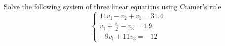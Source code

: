 \documentclass[a4paper, 12pt]{report}
\begin{document}
    \newpage
    \begin{tcolorbox}[title=\color{black}{\section{Q5}}, colback=white, colframe=black!30!white, boxrule=0.4mm, width=1\textwidth]
        Solve the following system of three linear equations using Cramer's rule
        \[
        \left\{\begin{array}{c}
            11 v_{1}-v_{2}+v_{3}=31.4 \\
            v_{1}+\frac{v_{2}}{2}-v_{3}=1.9 \\
            -9 v_{1}+11 v_{3}=-12
        \end{array}\right.
        \]
    \end{tcolorbox}
    
\end{document}
